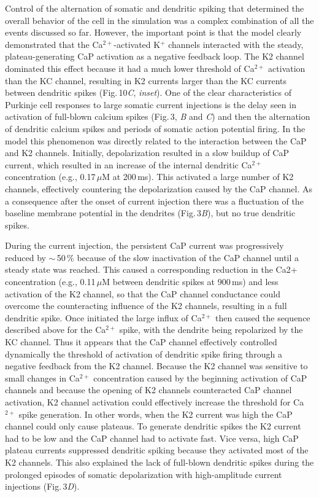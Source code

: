 \documentclass[12pt]{article}
\begin{document}
Control of the alternation of somatic and dendritic spiking that determined
the overall behavior of the cell in the simulation was
a complex combination of all the events discussed so far.
However, the important point is that the model clearly demonstrated
that the Ca$^{2+}$-activated K$^+$ channels interacted
with the steady, plateau-generating CaP activation as a negative
feedback loop. The K2 channel dominated this effect
because it had a much lower threshold of Ca$^{2+}$ activation
than the KC channel, resulting in K2 currents larger than
the KC currents between dendritic spikes (Fig.\,10{\it C}, {\it inset}).
One of the clear characteristics of Purkinje cell responses
to large somatic current injections is the delay seen in activation
of full-blown calcium spikes (Fig.\,3, {\it B} and {\it C}) and
then the alternation of dendritic calcium spikes and periods
of somatic action potential firing. In the model this phenomenon
was directly related to the interaction between
the CaP and K2 channels. Initially, depolarization resulted
in a slow buildup of CaP current, which resulted in an increase
of the internal dendritic Ca$^{2+}$ concentration (e.g.,
0.17\,$\mu$M at 200\,ms). This activated a large number of K2
channels, effectively countering the depolarization caused
by the CaP channel. As a consequence after the onset of
current injection there was a fluctuation of the baseline
membrane potential in the dendrites (Fig.\,3{\it B}), but no true
dendritic spikes.

During the current injection, the persistent CaP current
was progressively reduced by $\sim$\,50\,\% because of the slow
inactivation of the CaP channel until a steady state was
reached. This caused a corresponding reduction in the Ca2+
concentration (e.g., 0.11\,$\mu$M between dendritic spikes at
900\,ms) and less activation of the K2 channel, so that the
CaP channel conductance could overcome the counteracting
influence of the K2 channels, resulting in a full dendritic
spike. Once initiated the large influx of Ca$^{2+}$ then
caused the sequence described above for the Ca$^{2+}$ spike,
with the dendrite being repolarized by the KC channel.
Thus it appears that the CaP channel effectively controlled
dynamically the threshold of activation of dendritic
spike firing through a negative feedback from the K2 channel.
Because the K2 channel was sensitive to small changes
in Ca$^{2+}$ concentration caused by the beginning activation
of CaP channels and because the opening of K2 channels
counteracted CaP channel activation, K2 channel activation
could effectively increase the threshold for Ca$^{2+}$ spike
generation. In other words, when the K2 current was high
the CaP channel could only cause plateaus. To generate
dendritic spikes the K2 current had to be low and the CaP
channel had to activate fast. Vice versa, high CaP plateau
currents suppressed dendritic spiking because they activated
most of the K2 channels. This also explained the lack
of full-blown dendritic spikes during the prolonged episodes
of somatic depolarization with high-amplitude
current injections (Fig.\,3{\it D}).
\end{document}
